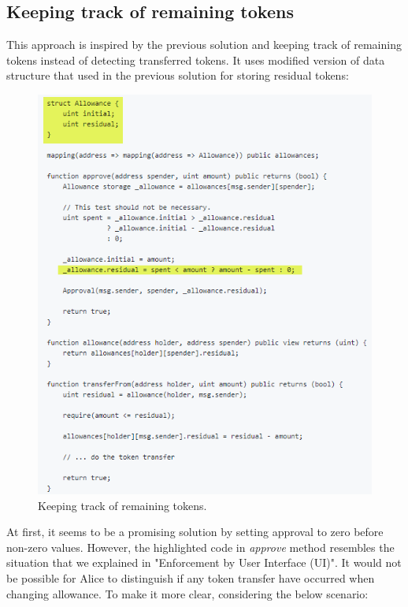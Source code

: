 \subsection{Keeping track of remaining tokens}
This approach\cite{Ref18} is inspired by the previous solution and keeping track of remaining tokens instead of detecting transferred tokens. It uses modified version of data structure that used in the previous solution for storing residual tokens:
\begin{figure}[H]
	\centering
	\includegraphics[width=1.0\linewidth]{figures/multiple_withdrawal_29.png}
	\caption{Keeping track of remaining tokens.}
\end{figure}
\noindent At first, it seems to be a promising solution by setting approval to zero before non-zero values. However, the highlighted code in \textit{approve} method resembles the situation that we explained in "Enforcement by User Interface (UI)". It would not be possible for Alice to distinguish if any token transfer have occurred when changing allowance. To make it more clear, considering the below scenario:  
